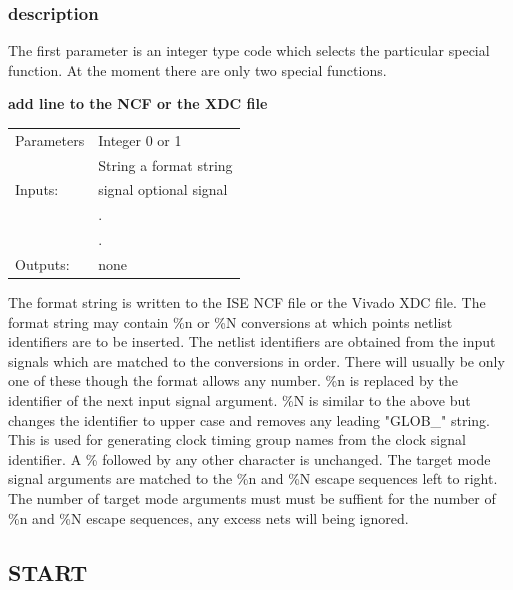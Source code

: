 \documentclass[10pt,a4paper,twoside,fleqn]{book}
\begin{document}
            \subsubsection{description}

                 The first parameter is an integer type code which selects the
                 particular special function. At the moment there are only two
                 special functions.

                {\bf add line to the NCF or the XDC file}

                \begin{tabular}{| l | l |}
                \hline
                Parameters  & Integer 0 or 1 \\
                            & String  a format string \\
                \hline
                Inputs:     & signal  optional signal \\
                            & . \\
                            & . \\
                \hline
                Outputs:    & none \\
                \hline
                \end{tabular}

                The format string is written to the ISE NCF file or the Vivado
                XDC file. The format string may contain \%n or \%N conversions
                at which points netlist identifiers are to be inserted. The
                netlist identifiers are obtained from the input signals which
                are matched to the conversions in order. There will usually be
                only one of these though the format allows any number. \%n is
                replaced by the identifier of the next input signal argument.
                \%N is similar to the above but changes the identifier to upper
                case and removes any leading "GLOB\_" string. This is used for
                generating clock timing group names from the clock signal
                identifier. A \% followed by any other character is unchanged.
                The target mode signal arguments are matched to the \%n and \%N
                escape sequences left to right. The number of target mode
                arguments must must be suffient for the number of \%n and \%N
                escape sequences, any excess nets will being ignored.


            \subsection{START}
\end{document}
